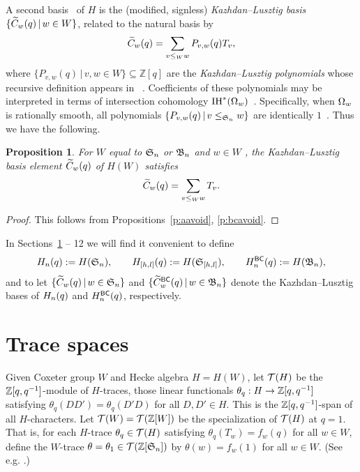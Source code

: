 \documentclass[11pt]{article}
\newtheorem{prop}[theo]{Proposition}
\theoremstyle{definition}
\numberwithin{equation}{section}
\begin{document}
A second basis~\cite{KLRepCH} of $H$ is the (modified, signless)
{\em Kazhdan--Lusztig basis} $\{ \widetilde{C}_{w}(q) \,|\, w \in W \}$,
related to the natural basis by
\begin{equation*}
  \widetilde{C}_{w}(q) = \sum_{v \leq_W w} P_{v,w}(q) T_v,
\end{equation*}
where
$\{ P_{v,w}(q) \,|\, v, w \in W \} \subseteq \mathbb Z[q]$ are the
{\em Kazhdan--Lusztig polynomials}
whose recursive definition appears in ~\cite{KLRepCH}.
Coefficients of these polynomials may be interpreted in terms of
intersection cohomology $\mathrm{IH}^*(\Omega_{w})$~\cite{KLSchub}.  Specifically,
when $\Omega_{w}$ is rationally smooth,
all
polynomials
$\{P_{v,w}(q) \,|\, v \leq_{\mathfrak{S}_n} w\}$
are identically
$1$~\cite[Thm.\,A.2]{KLRepCH}.
Thus we have the following.
\begin{prop}\label{p:abcsmoothkl}
  For $W$ equal to $\mathfrak{S}_n$ or $\mathfrak{B}_n$ and $w \in W$ \avoidingp,
  the Kazhdan--Lusztig basis element $\widetilde{C}_{w}(q)$
  of $H(W)$
  satisfies
  \begin{equation*}
    \widetilde{C}_{w}(q) = \sum_{v \leq_W w} T_v.
  \end{equation*}
\end{prop}
\begin{proof}
  This follows from Propositions~\ref{p:aavoid}, \ref{p:bcavoid}.
  \end{proof}


In Sections~\ref{s:trace} -- 12 we will find it convenient to define
\begin{equation*}
  H_n(q) := H(\mathfrak{S}_n), \qquad
  H_{[h,l]}(q) := H(\mathfrak{S}_{[h,l]}), \qquad
  H_n^{\mathsf{BC}}(q) := H(\mathfrak{B}_n),
  \end{equation*}
and to let $\{ \widetilde{C}_{w}(q) \,|\, w \in \mathfrak{S}_n \}$ and $\{ \widetilde{C}_{w}^{\mathsf{BC}}(q) \,|\, w \in \mathfrak{B}_n \}$
denote the Kazhdan--Lusztig bases of $H_n(q)$ and $H_n^{\mathsf{BC}}(q)$, respectively.

\section{Trace spaces}\label{s:trace}

Given
Coxeter group $W$ and
Hecke algebra $H = H(W)$,
let $\mathcal{T}(H)$ be the $\mathbb{Z}[q, q^{-1}]$-module of $H$-traces, 
those linear functionals $\theta_q: H \rightarrow \mathbb{Z}[q, q^{-1}]$ satisfying
$\theta_q(DD') = \theta_q(D'D)$ for all $D, D' \in H$.
This is the $\mathbb{Z}[q, q^{-1}]$-span of all $H$-characters.
Let $\mathcal{T}(W) = \mathcal{T}(\mathbb Z[W])$
be the specialization of $\mathcal{T}(H)$ at $q=1$.
That is,
for each $H$-trace
$\theta_q \in \mathcal{T}(H)$ satisfying
$\theta_q(T_w) = f_w(q)$
for all $w \in W$,
define the $W$-trace
$\theta = \theta_1 \in \mathcal{T}(\mathbb{Z}[\mathfrak{S}_n])$ by
$\theta(w) = f_w(1)$ for all $w \in W$.
(See e.g. \cite{GPCharHecke}.)
\end{document}
